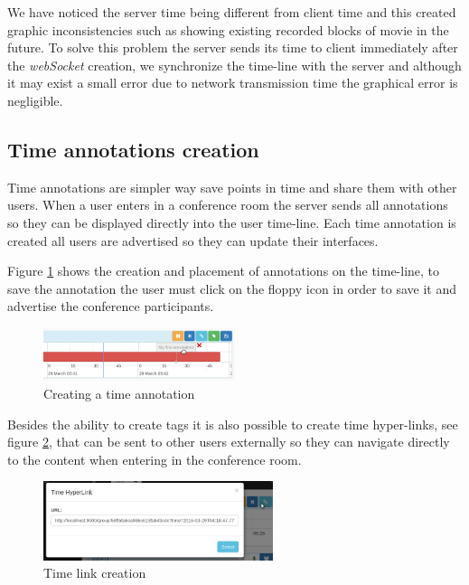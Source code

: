 	We have noticed the server time being different from client time and this created graphic inconsistencies such as showing existing recorded blocks of movie in the future. To solve this problem the server sends its time to client immediately after the \emph{webSocket} creation, we synchronize the time-line with the server and although it may exist a small error due to network transmission time the graphical error is negligible. 


	\subsection{Time annotations creation}

	Time annotations are simpler way save points in time and share them with other users. When a user enters in a conference room the server sends all annotations so they can be displayed directly into the user time-line. Each time annotation is created all users are advertised so they can update their interfaces.

	Figure \ref{fig:annotation} shows the creation and placement of annotations on the time-line, to save the annotation the user must click on the floppy icon in order to save it and advertise the conference participants. 

	\begin{figure}[!htb]
		\centering
		\includegraphics[width=0.5\textwidth]{figures/annotation.png}
		\caption{Creating a time annotation}
		\label{fig:annotation}
	\end{figure}

	Besides the ability to create tags it is also possible to create time hyper-links, see figure \ref{fig:timelink}, that can be sent to other users externally so they can navigate directly to the content when entering in the conference room.


	\begin{figure}[!htb]
		\centering
		\includegraphics[width=0.6\textwidth]{figures/timelink.png}
		\caption{Time link creation}
		\label{fig:timelink}
	\end{figure}


